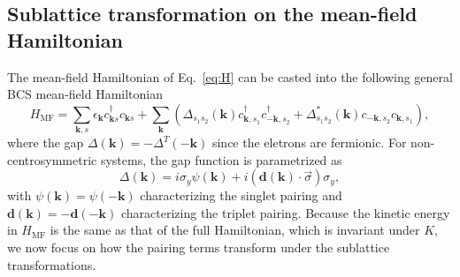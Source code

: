 \documentclass[11pt]{article}
\begin{document}
\subsection{Sublattice transformation on the mean-field Hamiltonian}
The mean-field Hamiltonian of Eq.~\eqref{eq:H} can be casted into the following
general BCS mean-field Hamiltonian
\begin{equation}\label{eq:MF-Hamiltonian}
    H_{\mathrm{MF}} = \sum_{\bm k, s}\epsilon_{\bm k} c^\dagger_{\bm k s} c_{\bm k s}
    + \sum_{\bm k} (\Delta_{s_1 s_2}(\bm k) c^\dagger_{\bm k, s_1}c^\dagger_{-\bm k, s_2} +
    \Delta_{s_1 s_2}^*(\bm k) c_{-\bm k, s_2} c_{\bm k, s_1}),
\end{equation}
where the gap $\Delta (\bm k) = - \Delta^T(-\bm k)$ since the eletrons are fermionic.
For non-centrosymmetric systems, the gap function is parametrized as
\begin{equation}\label{eq:gap}
    \Delta(\bm k) = i \sigma_y \psi(\bm k) + i(\bm d(\bm k)\cdot \vec{\sigma}) \sigma_y,
\end{equation}
with $\psi(\bm k) = \psi(-\bm k)$ characterizing the singlet pairing and
$\bm d (\bm k) = - \bm d(-\bm k)$ characterizing the triplet pairing.
Because the kinetic energy in $H_{\mathrm{MF}}$ is the same as that of the full Hamiltonian,
which is invariant under $K$, we now focus on how the pairing terms transform under the sublattice
transformations.
\end{document}
